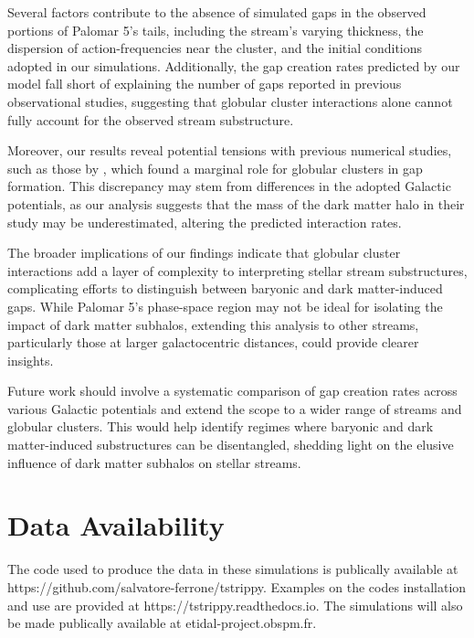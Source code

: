 \documentclass[draft]{aa}
\begin{document}
  Several factors contribute to the absence of simulated gaps in the observed portions of Palomar 5's tails, including the stream's varying thickness, the dispersion of action-frequencies near the cluster, and the initial conditions adopted in our simulations. Additionally, the gap creation rates predicted by our model fall short of explaining the number of gaps reported in previous observational studies, suggesting that globular cluster interactions alone cannot fully account for the observed stream substructure.

  Moreover, our results reveal potential tensions with previous numerical studies, such as those by \citet{2019MNRAS.484.2009B}, which found a marginal role for globular clusters in gap formation. This discrepancy may stem from differences in the adopted Galactic potentials, as our analysis suggests that the mass of the dark matter halo in their study may be underestimated, altering the predicted interaction rates.

  The broader implications of our findings indicate that globular cluster interactions add a layer of complexity to interpreting stellar stream substructures, complicating efforts to distinguish between baryonic and dark matter-induced gaps. While Palomar 5's phase-space region may not be ideal for isolating the impact of dark matter subhalos, extending this analysis to other streams, particularly those at larger galactocentric distances, could provide clearer insights.

  Future work should involve a systematic comparison of gap creation rates across various Galactic potentials and extend the scope to a wider range of streams and globular clusters. This would help identify regimes where baryonic and dark matter-induced substructures can be disentangled, shedding light on the elusive influence of dark matter subhalos on stellar streams.


  
\section*{Data Availability}

  The code used to produce the data in these simulations is publically available at https://github.com/salvatore-ferrone/tstrippy. Examples on the codes installation and use are provided at https://tstrippy.readthedocs.io. The simulations will also be made publically available at etidal-project.obspm.fr.
\end{document}
